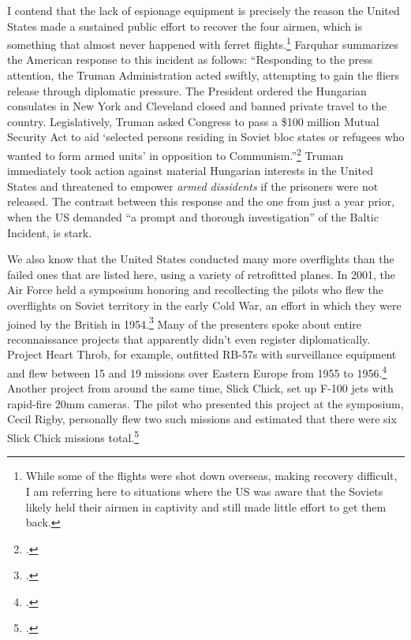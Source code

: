 \documentclass[14pt]{extarticle}
\begin{document}
I contend that the lack of espionage equipment is precisely the reason the United States made a sustained public effort to recover the four airmen, which is something that almost never happened with ferret flights.\footnote{While some of the flights were shot down overseas, making recovery difficult, I am referring here to situations where the US was aware that the Soviets likely held their airmen in captivity and still made little effort to get them back.} Farquhar summarizes the American response to this incident as follows: \enquote{Responding to the press attention, the Truman Administration acted swiftly, attempting to gain the fliers release through diplomatic pressure. The President ordered the Hungarian consulates in New York and Cleveland closed and banned private travel to the country. Legislatively, Truman asked Congress to pass a \$100 million Mutual Security Act to aid \enquote{selected persons residing in Soviet bloc states or refugees who wanted to form armed units} in opposition to Communism.}\footcite[p.~43]{farquhar_aerial_2015} Truman immediately took action against material Hungarian interests in the United States and threatened to empower \emph{armed dissidents} if the prisoners were not released. The contrast between this response and the one from just a year prior, when the US demanded \enquote{a prompt and thorough investigation} of the Baltic Incident, is stark.

We also know that the United States conducted many more overflights than the failed ones that are listed here, using a variety of retrofitted planes. In 2001, the Air Force held a symposium honoring and recollecting the pilots who flew the overflights on Soviet territory in the early Cold War, an effort in which they were joined by the British in 1954.\footcite[p.~v]{hall_early_2003} Many of the presenters spoke about entire reconnaissance projects that apparently didn't even register diplomatically. Project Heart Throb, for example, outfitted RB-57s with surveillance equipment and flew between 15 and 19 missions over Eastern Europe from 1955 to 1956.\footcite[p.~194. Based on the recollection of Gerald E. Cooke, a Air Force pilot assigned to the project.]{hall_early_2003} Another project from around the same time, Slick Chick, set up F-100 jets with rapid-fire 20mm cameras. The pilot who presented this project at the symposium, Cecil Rigby, personally flew two such missions and estimated that there were six Slick Chick missions total.\footcite[p.~176]{hall_early_2003}
\end{document}
